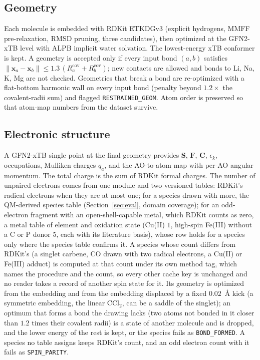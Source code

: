 \documentclass[11pt,a4paper]{article}
\newcommand{\vb}[1]{\bm{#1}}
\begin{document}
\subsection{Geometry}
Each molecule is embedded with RDKit ETKDGv3 (explicit hydrogens, MMFF pre-relaxation, RMSD pruning, three candidates), then optimized at the GFN2-xTB level with ALPB implicit water solvation. The lowest-energy xTB conformer is kept. A geometry is accepted only if every input bond $(a,b)$ satisfies $\|\vb{x}_a-\vb{x}_b\|\le 1.3\,(R^{\mathrm{cov}}_a+R^{\mathrm{cov}}_b)$; new contacts are allowed and bonds to Li, Na, K, Mg are not checked. Geometries that break a bond are re-optimized with a flat-bottom harmonic wall on every input bond (penalty beyond $1.2\times$ the covalent-radii sum) and flagged \texttt{RESTRAINED\_GEOM}. Atom order is preserved so that atom-map numbers from the dataset survive.

\subsection{Electronic structure}
\label{sec:qmspin}
A GFN2-xTB single point at the final geometry provides $\vb{S}$, $\vb{F}$, $\vb{C}$, $\epsilon_k$, occupations, Mulliken charges $q_a$, and the AO-to-atom map with per-AO angular momentum. The total charge is the sum of RDKit formal charges. The number of unpaired electrons comes from one module and two versioned tables: RDKit's radical electrons when they are at most one; for a species drawn with more, the QM-derived species table (Section~\ref{sec:eval}, domain coverage); for an odd-electron fragment with an open-shell-capable metal, which RDKit counts as zero, a metal table of element and oxidation state (Cu(II) $1$, high-spin Fe(III) without a C or P donor $5$, each with its literature basis), whose row holds for a species only where the species table confirms it. A species whose count differs from RDKit's (a singlet carbene, CO drawn with two radical electrons, a Cu(II) or Fe(III) adduct) is computed at that count under its own method tag, which names the procedure and the count, so every other cache key is unchanged and no reader takes a record of another spin state for it. Its geometry is optimized from the embedding and from the embedding displaced by a fixed $0.02$~\AA{} kick (a symmetric embedding, the linear CCl$_2$, can be a saddle of the singlet); an optimum that forms a bond the drawing lacks (two atoms not bonded in it closer than $1.2$ times their covalent radii) is a state of another molecule and is dropped, and the lower energy of the rest is kept, or the species fails as \texttt{BOND\_FORMED}. A species no table assigns keeps RDKit's count, and an odd electron count with it fails as \texttt{SPIN\_PARITY}.
\end{document}
